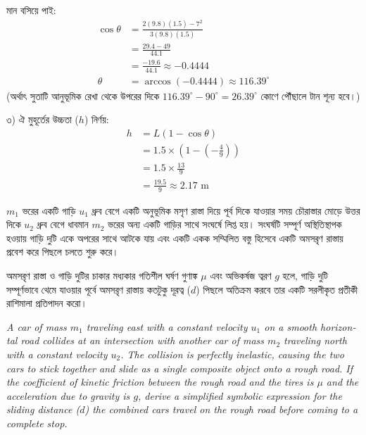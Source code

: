 \documentclass[12pt, a4paper]{article}
\begin{document}
\begin{tcolorbox}[solutionbox={সমাধান (Solution)}]
মান বসিয়ে পাই:
\begin{align*}
    \cos\theta &= \frac{2(9.8)(1.5) - 7^2}{3(9.8)(1.5)} \\
               &= \frac{29.4 - 49}{44.1} \\
               &= \frac{-19.6}{44.1} \approx -0.4444 \\
    \theta &= \arccos(-0.4444) \approx \mathbf{116.39^\circ}
\end{align*}
(অর্থাৎ সুতাটি আনুভূমিক রেখা থেকে উপরের দিকে $116.39^\circ - 90^\circ = 26.39^\circ$ কোণে পৌঁছালে টান শূন্য হবে।)

৩) ঐ মুহূর্তের উচ্চতা ($h$) নির্ণয়:
\begin{align*}
    h &= L(1 - \cos\theta) \\
      &= 1.5 \times \left(1 - \left(-\frac{4}{9}\right)\right) \\
      &= 1.5 \times \frac{13}{9} \\
      &= \frac{19.5}{9} \approx \mathbf{2.17}\text{ m}
\end{align*}
\end{tcolorbox}
\begin{tcolorbox}[questionbox={প্রশ্ন (Question) 11}]
\noindent
$m_1$ ভরের একটি গাড়ি $u_1$ ধ্রুব বেগে একটি অনুভূমিক মসৃণ রাস্তা দিয়ে পূর্ব দিকে যাওয়ার সময় চৌরাস্তার মোড়ে উত্তর দিকে $u_2$ ধ্রুব বেগে ধাবমান $m_2$ ভরের অন্য একটি গাড়ির সাথে সংঘর্ষে লিপ্ত হয়। সংঘর্ষটি সম্পূর্ণ অস্থিতিস্থাপক হওয়ায় গাড়ি দুটি একে অপরের সাথে আটকে যায় এবং একটি একক সম্মিলিত বস্তু হিসেবে একটি অমসরৃণ রাস্তায় প্রবেশ করে পিছলে চলতে শুরু করে। 

\vspace{0.3em}
\noindent
অমসরৃণ রাস্তা ও গাড়ি দুটির চাকার মধ্যকার গতিশীল ঘর্ষণ গুণাঙ্ক $\mu$ এবং অভিকর্ষজ ত্বরণ $g$ হলে, গাড়ি দুটি সম্পূর্ণভাবে থেমে যাওয়ার পূর্বে অমসরৃণ রাস্তায় কতটুকু দূরত্ব ($d$) পিছলে অতিক্রম করবে তার একটি সরলীকৃত প্রতীকী রাশিমালা প্রতিপাদন করো।

\vspace{0.8em}
\begin{english}
\noindent\textit{\color{darkgray}
A car of mass $m_1$ traveling east with a constant velocity $u_1$ on a smooth horizontal road collides at an intersection with another car of mass $m_2$ traveling north with a constant velocity $u_2$. The collision is perfectly inelastic, causing the two cars to stick together and slide as a single composite object onto a rough road. If the coefficient of kinetic friction between the rough road and the tires is $\mu$ and the acceleration due to gravity is $g$, derive a simplified symbolic expression for the sliding distance ($d$) the combined cars travel on the rough road before coming to a complete stop.
}
\end{english}
\end{tcolorbox}
\end{document}
